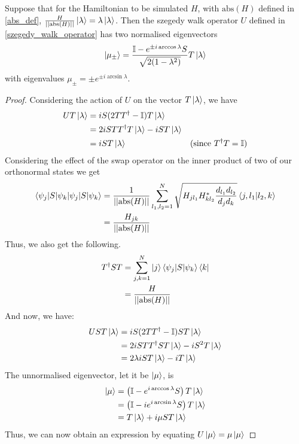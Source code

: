 \documentclass[
10pt, %
a4paper, %
oneside, %
headinclude,footinclude, %
BCOR5mm, %
]{scrartcl}
\begin{document}
\begin{theorem}\label{eigenvalue_eigenvector_szegedy_walk_operator}
Suppose that for the Hamiltonian to be simulated $H$, with $\text{abs}(H)$ defined in \ref{abs_def}, $\frac{H}{||\text{abs}(H)||}\ket\lambda=\lambda\ket\lambda$. Then the szegedy walk operator $U$ defined in \ref{szegedy_walk_operator} has two normalised eigenvectors
$$\ket{\mu_{\pm}}=\frac{\mathbb{I}-e^{\pm i\arccos\lambda}S}{\sqrt{2(1-\lambda^2)}}T\ket\lambda$$
with eigenvalues $\mu_{\pm}=\pm e^{\pm i\arcsin\lambda}$.
\end{theorem}
\begin{proof}
Considering the action of $U$ on the vector $T\ket\lambda$, we have
\begin{align*}
UT\ket\lambda&=iS(2TT^{\dagger}-\mathbb{I})T\ket\lambda\\
&=2iSTT^{\dagger}T\ket\lambda-iST\ket\lambda\\
&=iST\ket\lambda&(\text{since }T^{\dagger}T=\mathbb{I})
\end{align*}
Considering the effect of the swap operator on the inner product of two of our orthonormal states we get
\begin{align*}
\braket{\psi_j|S|\psi_k}&=\frac{1}{||\text{abs}(H)||}\sum_{l_1,l_2=1}^N\sqrt{H_{jl_1}H_{kl_2}^*\frac{d_{l_1}d_{l_2}}{d_jd_k}}\braket{j,l_1}{l_2,k}\\
&=\frac{H_{jk}}{||\text{abs}(H)||}
\end{align*}
Thus, we also get the following.
\begin{align*}
T^{\dagger}ST&=\sum_{j,k=1}^N\ket j\left<\psi_j|S|\psi_k\right>\bra k\\
&=\frac{H}{||\text{abs}(H)||}
\end{align*}
And now, we have:
\begin{align*}
UST\ket\lambda&=iS(2TT^{\dagger}-\mathbb{I})ST\ket\lambda\\
&=2iSTT^{\dagger}ST\ket\lambda-iS^2T\ket\lambda\\
&=2\lambda iST\ket\lambda-iT\ket\lambda
\end{align*}
The unnormalised eigenvector, let it be $\ket\mu$, is
\begin{align*}
\ket\mu&=\left(\mathbb{I}-e^{i\arccos\lambda}S\right)T\ket\lambda\\
&=\left(\mathbb{I}-ie^{i\arcsin\lambda}S\right)T\ket\lambda\\
&=T\ket\lambda+i\mu ST\ket\lambda
\end{align*}
Thus, we can now obtain an expression by equating $U\ket\mu=\mu\ket\mu$

\end{proof}
\end{document}
